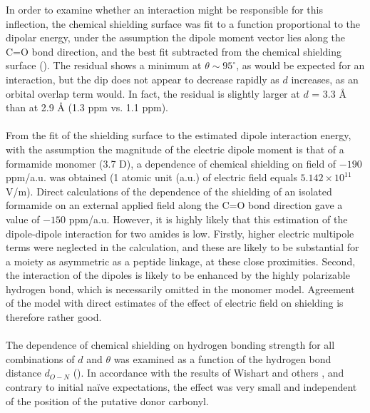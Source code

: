 \begin{doublespace}
In order to examine whether an \npipistar{} interaction might be responsible
for this inflection, the chemical shielding surface was fit to a function
proportional to the dipolar energy, under the assumption the dipole moment
vector lies along the C=O bond direction, and the best fit subtracted from the
chemical shielding surface (). The residual shows a
minimum at $\theta \sim 95^\circ$, as would be expected for an \npipistar{}
interaction, but the dip does not appear to decrease rapidly as $d$ increases,
as an orbital overlap term would. In fact, the residual is slightly larger at
$d$ = 3.3 \r{A} than at 2.9 \r{A} (1.3 ppm vs. 1.1 ppm).
\\\\
From the fit of the shielding surface to the estimated dipole interaction
energy, with the assumption the magnitude of the electric dipole moment is
that of a formamide monomer (3.7 D), a dependence of chemical shielding on
field of $-190$ ppm/a.u. was obtained (1 atomic unit (a.u.) of electric field
equals $5.142\times10^{11}$ V/m). Direct calculations of the dependence of the
shielding of an isolated formamide on an external applied field along the C=O
bond direction gave a value of $-150$ ppm/a.u. However, it is highly likely
that this estimation of the dipole-dipole interaction for two amides is low.
Firstly, higher electric multipole terms were neglected in the calculation,
and these are likely to be substantial for a moiety as asymmetric as a peptide
linkage, at these close proximities. Second, the interaction of the dipoles
is likely to be enhanced by the highly polarizable hydrogen bond, which is
necessarily omitted in the monomer model. Agreement of the model with direct
estimates of the effect of electric field on shielding is therefore rather
good.
\\\\
The dependence of chemical shielding on hydrogen bonding strength for all
combinations of $d$ and $\theta$ was examined as a function of the hydrogen
bond distance $d_{O-N}$ (). In accordance with
the results of Wishart and others
\cite{cisnetti:cpc2004,neal:jbnmr2003,markwick:jacs2004}, and contrary
to initial na\"{i}ve expectations, the effect was very small and
independent of the position of the putative \npipistar{} donor
carbonyl.
\end{doublespace}

